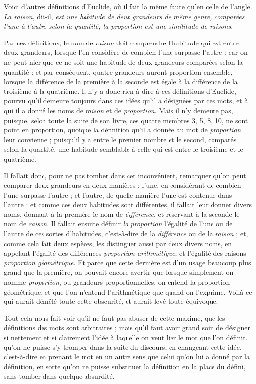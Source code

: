 Voici d'autres définitions d'Euclide, où il fait la même faute qu'en celle de l'angle. \emph{La raison}, dit-il, \emph{est une habitude de deux grandeurs de même genre, comparées l'une à l'autre selon la quantité; la proportion est une similitude de raisons}.

Par ces définitions, le nom de \emph{raison} doit comprendre l'habitude qui est entre deux grandeurs, lorsque l'on considère de combien l'une surpasse l'autre : car on ne peut nier que ce ne soit une habitude de deux grandeurs comparées selon la quantité : et par conséquent, quatre grandeurs auront proportion ensemble, lorsque la différence de la première à la seconde est égale à la différence de la troisième à la quatrième. Il n'y a donc rien à dire à ces définitions d'Euclide, pourvu qu'il demeure toujours dans ces idées qu'il a désignées par ces mots, et à qui il a donné les noms de \emph{raison} et de \emph{proportion}. Mais il n'y demeure pas, puisque, selon toute la suite de son livre, ces quatre membres 3, 5, 8, 10, ne sont point en proportion, quoique la définition qu'il a donnée au mot de \emph{proportion} leur convienne ; puisqu'il y a entre le premier nombre et le second, comparés selon la quantité, une habitude semblable à celle qui est entre le troisième et le quatrième.

Il fallait donc, pour ne pas tomber dans cet inconvénient, remarquer qu'on peut comparer deux grandeurs en deux manières ; l'une, en considérant de combien l'une surpasse l'autre ; et l'autre, de quelle manière l'une est contenue dans l'autre : et comme ces deux habitudes sont différentes, il fallait leur donner divers noms, donnant à la première le nom de \emph{différence}, et réservant à la seconde le nom de \emph{raison}. Il fallait ensuite définir \emph{la proportion} l'égalité de l'une ou de l'autre de ces sortes d'habitudes, c'est-à-dire de la \emph{différence} ou de la \emph{raison} ; et, comme cela fait deux espèces, les distinguer aussi par deux divers noms, en appelant l'égalité des différences \emph{proportion arithmétique}, et l'égalité des raisons \emph{proportion géométrique}. Et parce que cette dernière est d'un usage beaucoup plus grand que la première, on pouvait encore avertir que lorsque simplement on nomme \emph{proportion}, ou grandeurs proportionnelles, on entend la proportion géométrique, et que l'on n'entend l'arithmétique que quand on l'exprime. Voilà ce qui aurait démêlé toute cette obscurité, et aurait levé toute équivoque.

Tout cela nous fait voir qu'il ne faut pas abuser de cette maxime, que les définitions des mots sont arbitraires ; mais qu'il faut avoir grand soin de désigner si nettement et si clairement l'idée à laquelle on veut lier le mot que l'on définit, qu'on ne puisse s'y tromper dans la suite du discours, en changeant cette idée, c'est-à-dire en prenant le mot en un autre sens que celui qu'on lui a donné par la définition, en sorte qu'on ne puisse substituer la définition en la place du défini, sans tomber dans quelque absurdité.

